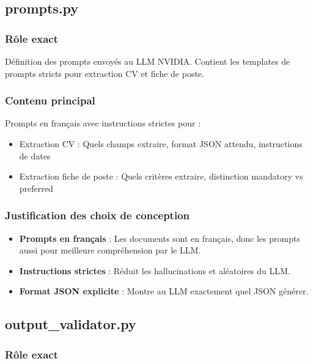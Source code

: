 \documentclass[12pt,a4paper,oneside]{book}
\begin{document}
\subsection{prompts.py}

\subsubsection{Rôle exact}

Définition des prompts envoyés au LLM NVIDIA. Contient les templates de prompts stricts pour extraction CV et fiche de poste.

\subsubsection{Contenu principal}

Prompts en français avec instructions strictes pour :
\begin{itemize}
    \item Extraction CV : Quels champs extraire, format JSON attendu, instructions de dates
    \item Extraction fiche de poste : Quels critères extraire, distinction mandatory vs preferred
\end{itemize}

\subsubsection{Justification des choix de conception}

\begin{itemize}
    \item \textbf{Prompts en français} : Les documents sont en français, donc les prompts aussi pour meilleure compréhension par le LLM.
    
    \item \textbf{Instructions strictes} : Réduit les hallucinations et aléatoires du LLM.
    
    \item \textbf{Format JSON explicite} : Montre au LLM exactement quel JSON générer.
\end{itemize}

\subsection{output\_validator.py}

\subsubsection{Rôle exact}
\end{document}
